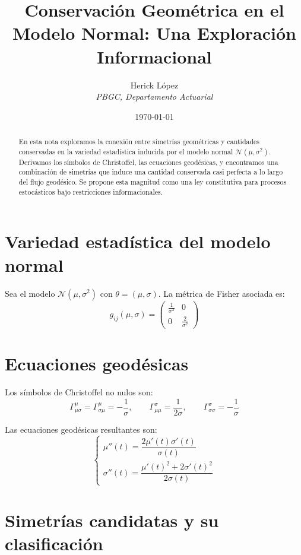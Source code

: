 \documentclass[11pt]{article}
\title{Conservaci\'on Geom\'etrica en el Modelo Normal: Una Exploraci\'on Informacional}
\author{Herick L\'opez \\ \small \textit{PBGC, Departamento Actuarial}}
\date{\today}
\begin{document}
	
	\maketitle
	
	\begin{abstract}
		En esta nota exploramos la conexi\'on entre simetr\'ias geom\'etricas y cantidades conservadas en la variedad estad\'istica inducida por el modelo normal $\mathcal{N}(\mu, \sigma^2)$. Derivamos los s\'imbolos de Christoffel, las ecuaciones geod\'esicas, y encontramos una combinaci\'on de simetr\'ias que induce una cantidad conservada casi perfecta a lo largo del flujo geod\'esico. Se propone esta magnitud como una ley constitutiva para procesos estoc\'asticos bajo restricciones informacionales.
	\end{abstract}
	
	\section{Variedad estad\'istica del modelo normal}
	
	Sea el modelo $\mathcal{N}(\mu, \sigma^2)$ con $\theta = (\mu, \sigma)$. La m\'etrica de Fisher asociada es:
	\[
	g_{ij}(\mu, \sigma) = \begin{pmatrix} \frac{1}{\sigma^2} & 0 \\ 0 & \frac{2}{\sigma^2} \end{pmatrix}
	\]
	
	\section{Ecuaciones geod\'esicas}
	
	Los s\'imbolos de Christoffel no nulos son:
	\[
	\Gamma^\mu_{\mu\sigma} = \Gamma^\mu_{\sigma\mu} = -\frac{1}{\sigma}, \qquad
	\Gamma^\sigma_{\mu\mu} = \frac{1}{2\sigma}, \qquad
	\Gamma^\sigma_{\sigma\sigma} = -\frac{1}{\sigma}
	\]
	
	Las ecuaciones geod\'esicas resultantes son:
	\[
	\begin{cases}
		\mu''(t) = \dfrac{2\mu'(t)\sigma'(t)}{\sigma(t)} \\
		\sigma''(t) = \dfrac{\mu'(t)^2 + 2\sigma'(t)^2}{2\sigma(t)}
	\end{cases}
	\]
	
	\section{Simetr\'ias candidatas y su clasificaci\'on}
	
\end{document}
